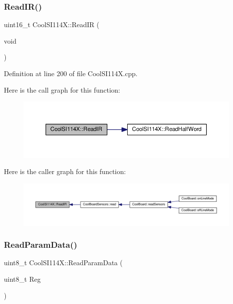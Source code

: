 \subsubsection{\texorpdfstring{Read\+I\+R()}{ReadIR()}}
{\footnotesize\ttfamily uint16\+\_\+t Cool\+S\+I114\+X\+::\+Read\+IR (\begin{DoxyParamCaption}\item[{void}]{ }\end{DoxyParamCaption})}



Definition at line 200 of file Cool\+S\+I114\+X.\+cpp.

Here is the call graph for this function\+:\nopagebreak
\begin{figure}[H]
\begin{center}
\leavevmode
\includegraphics[width=350pt]{class_cool_s_i114_x_abc536ee7ae8e3ba9d1069acc3889a2cf_cgraph}
\end{center}
\end{figure}
Here is the caller graph for this function\+:\nopagebreak
\begin{figure}[H]
\begin{center}
\leavevmode
\includegraphics[width=350pt]{class_cool_s_i114_x_abc536ee7ae8e3ba9d1069acc3889a2cf_icgraph}
\end{center}
\end{figure}
\mbox{\label{class_cool_s_i114_x_a33cf431103c722442f6a0cc93848d640}} 
\subsubsection{\texorpdfstring{Read\+Param\+Data()}{ReadParamData()}}
{\footnotesize\ttfamily uint8\+\_\+t Cool\+S\+I114\+X\+::\+Read\+Param\+Data (\begin{DoxyParamCaption}\item[{uint8\+\_\+t}]{Reg }\end{DoxyParamCaption})}



